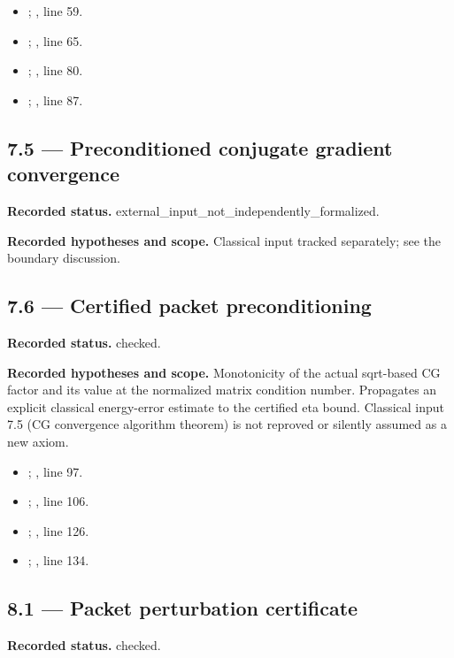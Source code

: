 \begin{itemize}
\item {}; , line 59.
\item {}; , line 65.
\item {}; , line 80.
\item {}; , line 87.
\end{itemize}
\subsection{7.5 — Preconditioned conjugate gradient convergence}
\label{result:7.5}
\textbf{Recorded status.} external\_input\_not\_independently\_formalized.

\textbf{Recorded hypotheses and scope.} Classical input tracked separately; see the boundary discussion.

\subsection{7.6 — Certified packet preconditioning}
\label{result:7.6}
\textbf{Recorded status.} checked.

\textbf{Recorded hypotheses and scope.} Monotonicity of the actual sqrt-based CG factor and its value at the normalized matrix condition number. Propagates an explicit classical energy-error estimate to the certified eta bound. Classical input 7.5 (CG convergence algorithm theorem) is not reproved or silently assumed as a new axiom.

\begin{itemize}
\item {}; , line 97.
\item {}; , line 106.
\item {}; , line 126.
\item {}; , line 134.
\end{itemize}
\subsection{8.1 — Packet perturbation certificate}
\label{result:8.1}
\textbf{Recorded status.} checked.

